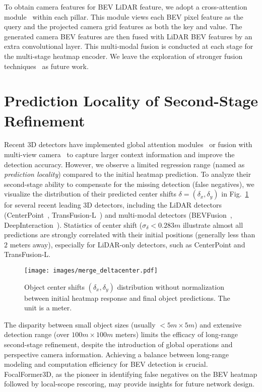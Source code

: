 \documentclass[10pt,twocolumn,letterpaper]{article}
\begin{document}
To obtain camera features for BEV LiDAR feature, we adopt a cross-attention module~\cite{deepinteraction} within each pillar. This module views each BEV pixel feature as the query and the projected camera grid features as both the key and value. The generated camera BEV features are then fused with LiDAR BEV features by an extra convolutional layer. This multi-modal fusion is conducted at each stage for the multi-stage heatmap encoder. We leave the exploration of stronger fusion techniques~\cite{bevfusion, deepinteraction, bevfusionmit} as future work.

\section{Prediction Locality of Second-Stage Refinement}
\label{sec: prediction locality}
Recent 3D detectors have implemented global attention modules~\cite{transfusion} or fusion with multi-view camera~\cite{bevfusion, deepinteraction} to capture larger context information and improve the detection accuracy. However, we observe a limited regression range (named as \textit{prediction locality}) compared to the initial heatmap prediction. To analyze their second-stage ability to compensate for the missing detection (false negatives), we visualize the distribution of their predicted center shifts $\delta = (\delta_x, \delta_y)$ in Fig.~\ref{fig:deltacenter} for several recent leading 3D detectors, including the LiDAR detectors (CenterPoint~\cite{centerpoint}, TransFusion-L~\cite{transfusion}) and multi-modal detectors (BEVFusion~\cite{bevfusion}, DeepInteraction~\cite{deepinteraction}). Statistics of center shift ($\sigma_\delta < 0.283m$ illustrate almost all predictions are strongly correlated with their initial positions (generally less than $2$ meters away), especially for LiDAR-only detectors, such as CenterPoint and TransFusion-L. 

\begin{figure}[h]
	\begin{center}
		\texttt{[image: images/merge\_deltacenter.pdf]}
	\end{center}
	\caption{Object center shifts $(\delta_x, \delta_y)$ distribution without normalization between initial heatmap response and final object predictions. The unit is a meter.}
	\label{fig:deltacenter}
\end{figure}

The disparity between small object sizes (usually $<5m\times 5m$) and extensive detection range (over $100m\times 100m$ meters) limits the efficacy of long-range second-stage refinement, despite the introduction of global operations and perspective camera information. Achieving a balance between long-range modeling and computation efficiency for BEV detection is crucial. FocalFormer3D, as the pioneer in identifying false negatives on the BEV heatmap followed by local-scope rescoring, may provide insights for future network design.
\end{document}
